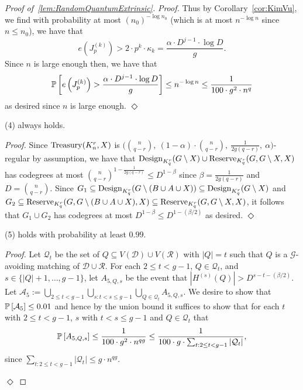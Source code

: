 \documentclass[11pt]{article}
\newcommand{\mc}[1]{\mathcal{#1}}
\newcounter{i}
\theoremstyle{plain}
\newenvironment{proofclaim}[1][]%
{\noindent \emph{Proof.} {}{#1}{}}{\hfill
	$\Diamond$\vspace{1em}}
\renewcommand{\theclaim}{\thetheorem.\arabic{claim}}
\newenvironment{lateproof}[1]
 {%
  \renewcommand{\theclaim}{\ref{#1}.\arabic{claim}}%
  \begin{proof}[Proof of~\cref{#1}]%
 }
 {\end{proof}}
\theoremstyle{plain} %
\theoremstyle{definition}
\newcommand{\Prob}[1]{\ensuremath{%
\mathbb P\left[#1\right]
}}
\begin{document}
\begin{lateproof}{lem:RandomQuantumExtrinsic}
\begin{proofclaim}
Thus by Corollary~\ref{cor:KimVu}, we find with probability at most
$(n_0)^{-\log n_0}$ (which is at most $n^{-\log n}$ since $n\le n_0$), we have that
$$e\left(J^{(k)}_p\right) > 2\cdot p^k\cdot \kappa_k = \frac{\alpha \cdot D^{j-1}\cdot \log D}{g}.$$ 
Since $n$ is large enough then, we have that
$$\Prob{e\left(J^{(k)}_p\right) > \frac{\alpha\cdot D^{j-1}\cdot \log D}{g}} \le n^{-\log n} \le  \frac{1}{100\cdot g^2\cdot n^q}$$
as desired since $n$ is large enough.
\end{proofclaim}

\begin{claim}\label{cl:8Holds}
(4) always holds.    
\end{claim}
\begin{proofclaim}
Since ${\rm Treasury}(K_n^r,X)$ is $\bigg(\binom{n}{q-r},~(1-\alpha)\cdot \binom{n}{q-r},~\frac{1}{2g(q-r)},~\alpha\bigg)$-regular by assumption, we have that ${\rm Design}_{K_q^r}(G\setminus X)\cup {\rm Reserve}_{K_q^r}(G, G\setminus X, X)$ has codegrees at most $\binom{n}{q-r}^{1- \frac{1}{2g(q-r)}} \le D^{1-\beta}$
since $\beta = \frac{1}{2g(q-r)}$ and $D = \binom{n}{q-r}$. Since $G_1 \subseteq {\rm Design}_{K_q^r}(G\setminus (B\cup A\cup X)) \subseteq {\rm Design}_{K_q^r}(G\setminus X)$ and $G_2\subseteq {\rm Reserve}_{K_q^r}(G,G\setminus (B\cup A\cup X),X) \subseteq {\rm Reserve}_{K_q^r}(G, G\setminus X, X)$, it follows that $G_1\cup G_2$ has codegrees at most $D^{1-\beta} \le D^{1-(\beta/2)}$ as desired.
\end{proofclaim}

\begin{claim}\label{cl:9Holds}
(5) holds with probability at least $0.99$.    
\end{claim}
\begin{proofclaim}
Let $\mc{Q}_t$ be the set of $Q\subseteq V(\mc{D})\cup V(\mc{R})$ with $|Q|=t$ such that $Q$ is a $\mc{G}$-avoiding matching of $\mc{D}\cup \mc{R}$.
For each $2\le t < g-1$, $Q\in \mc{Q}_t$, and $s\in \{|Q|+1,\ldots, g-1\}$, let $A_{5,Q,s}$ be the event that $|H^{(s)}(Q)| > D^{s-t-(\beta/2)}$.
Let $\mathcal{A}_5 := \bigcup_{2\le t< g-1} \bigcup_{s: t< s\le g-1} \bigcup_{Q\in \mc{Q}_t} A_{5,Q,s}$. We desire to show that $\Prob{\mc{A}_5} \le 0.01$ and hence by the union bound it suffices to show that for each $t$ with $2\le t < g-1$, $s$ with $t< s \le g-1$ and $Q\in \mc{Q}_t$ that
$$\Prob{A_{5,Q,s}} \le \frac{1}{100\cdot g^2\cdot n^{qg}} \le \frac{1}{100 \cdot g\cdot \sum_{t: 2\le t < g-1} |\mc{Q}_t|},$$
since $\sum_{t: 2\le t < g-1} |\mc{Q}_t|\le g\cdot n^{qg}$.


\end{proofclaim}
\end{lateproof}
\end{document}

